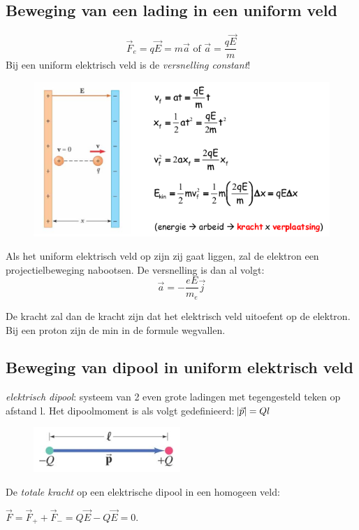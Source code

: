 \documentclass[12pt,a4paper]{article}
\begin{document}
	\subsection{Beweging van een lading in een uniform veld}
	\[\vec{F}_e = q\vec{E} = m\vec{a} \text{  of  } \vec{a}=\frac{q\vec{E}}{m}\]
	Bij een uniform elektrisch veld is de \textit{versnelling constant}!
	\begin{figure}[h]
		\centering
		\includegraphics[width=0.7\linewidth]{uniform-elektrisch-veld}
		\label{fig:uniform-elektrisch-veld}
	\end{figure}
	Als het uniform elektrisch veld op zijn zij gaat liggen, zal de elektron een projectielbeweging nabootsen. De versnelling is dan al volgt: 
	\[\vec{a}=-\frac{eE}{m_e}\vec{j}\]
	
	De kracht zal dan de kracht zijn dat het elektrisch veld uitoefent op de elektron. Bij een proton zijn de min in de formule wegvallen. 
	
	\subsection{Beweging van dipool in uniform elektrisch veld}
	\textit{elektrisch dipool}: systeem van 2 even grote ladingen met tegengesteld teken op afstand l.
	Het dipoolmoment is als volgt gedefinieerd: \(\abs{\vec{p}} = Ql\)
	\begin{figure}[h]
		\centering
		\includegraphics[width=0.3\linewidth]{dipool}
		\label{fig:dipool}
	\end{figure}

	De \textit{totale kracht} op een elektrische dipool in een homogeen veld: 

	\(\vec{F} = \vec{F}_+ + \vec{F}_- = Q\vec{E} - Q\vec{E} = 0\).
	
\end{document}
